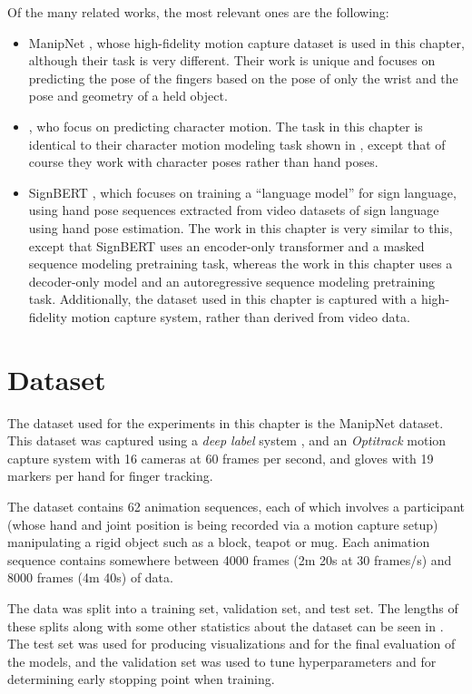 Of the many related works, the most relevant ones are the following:
\begin{itemize}
    \item ManipNet \cite{manipnet}, whose high-fidelity motion capture dataset is used in this chapter, although their task is very different. Their work is unique and focuses on predicting the pose of the fingers based on the pose of only the wrist and the pose and geometry of a held object.
    \item \cite{structured-prediction}, who focus on predicting character motion. The task in this chapter is identical to their character motion modeling task shown in , except that of course they work with character poses rather than hand poses.
    \item SignBERT \cite{signbert}, which focuses on training a ``language model'' for sign language, using hand pose sequences extracted from video datasets of sign language using hand pose estimation. The work in this chapter is very similar to this, except that SignBERT uses an encoder-only transformer and a masked sequence modeling pretraining task, whereas the work in this chapter uses a decoder-only model and an autoregressive sequence modeling pretraining task. Additionally, the dataset used in this chapter is captured with a high-fidelity motion capture system, rather than derived from video data.
\end{itemize}

\section{Dataset}
\label{s:dataset}

The dataset used for the experiments in this chapter is the ManipNet \cite{manipnet} dataset. This dataset was captured using a \textit{deep label} system \cite{deep-labeling}, and an \textit{Optitrack} \cite{optitrack} motion capture system with 16 cameras at 60 frames per second, and gloves with 19
markers per hand for finger tracking.

The dataset contains 62 animation sequences, each of which involves a participant (whose hand and joint position is being recorded via a motion capture setup) manipulating a rigid object such as a block, teapot or mug. Each animation sequence contains somewhere between 4000 frames (2m 20s at 30 frames/s) and 8000 frames (4m 40s) of data.

The data was split into a training set, validation set, and test set. The lengths of these splits along with some other statistics about the dataset can be seen in . The test set was used for producing visualizations and for the final evaluation of the models, and the validation set was used to tune hyperparameters and for determining early stopping point when training.

